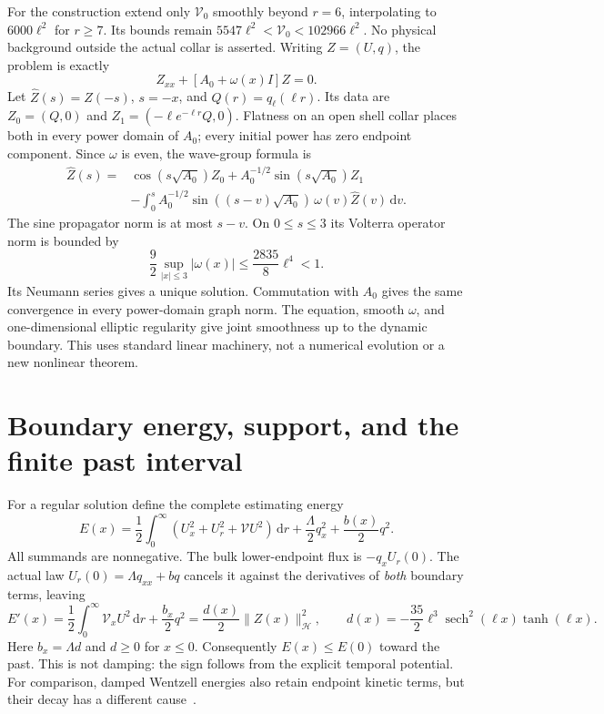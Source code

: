 \documentclass[11pt]{article}
\newcommand{\dd}{\,\mathrm d}
\newcommand{\norm}[1]{\lVert #1\rVert}
\newcommand{\HH}{\mathcal H}
\begin{document}
For the construction extend only $\mathcal V_0$ smoothly beyond $r=6$,
interpolating to $6000\ell^2$ for $r\ge7$. Its bounds remain
$5547\ell^2<\mathcal V_0<102966\ell^2$.
No physical background outside the actual collar is asserted.
Writing $Z=(U,q)$, the problem is exactly
\begin{equation}
 Z_{xx}+[A_0+\omega(x)I]Z=0.
 \label{eq:abstract}
\end{equation}
Let $\widehat Z(s)=Z(-s)$, $s=-x$, and $Q(r)=q_\ell(\ell r)$.
Its data are $Z_0=(Q,0)$ and
$Z_1=(-\ell e^{-\ell r}Q,0)$. Flatness on an open shell collar places
both in every power domain of $A_0$; every initial power has zero
endpoint component. Since $\omega$ is even, the wave-group formula is
\begin{equation}
\begin{aligned}
 \widehat Z(s)={}&\cos(s\sqrt{A_0})Z_0+
               A_0^{-1/2}\sin(s\sqrt{A_0})Z_1\\
 &-\int_0^s A_0^{-1/2}\sin((s-v)\sqrt{A_0})\,
                   \omega(v)\widehat Z(v)\dd v .
\end{aligned}
\label{eq:volterra}
\end{equation}
The sine propagator norm is at most $s-v$. On $0\le s\le3$ its
Volterra operator norm is bounded by
\begin{equation}
 \frac92\sup_{|x|\le3}|\omega(x)|
       \le\frac{2835}{8}\ell^4<1 .
 \label{eq:contraction}
\end{equation}
Its Neumann series gives a unique solution. Commutation with $A_0$
gives the same convergence in every power-domain graph norm.
The equation, smooth $\omega$, and one-dimensional elliptic regularity
give joint smoothness up to the dynamic boundary.
This uses standard linear machinery, not a numerical evolution or a
new nonlinear theorem.

\section{Boundary energy, support, and the finite past interval}
For a regular solution define the complete estimating energy
\begin{equation}
 E(x)=\frac12\int_0^\infty
       (U_x^2+U_r^2+\mathcal VU^2)\dd r
        +\frac{\Lambda}{2}q_x^2+\frac{b(x)}2q^2.
 \label{eq:energy}
\end{equation}
All summands are nonnegative. The bulk lower-endpoint flux is
$-q_xU_r(0)$. The actual law $U_r(0)=\Lambda q_{xx}+bq$ cancels it
against the derivatives of \emph{both} boundary terms, leaving
\begin{equation}
 E'(x)=\frac12\int_0^\infty\mathcal V_xU^2\dd r
          +\frac{b_x}2q^2
       =\frac{d(x)}2\norm{Z(x)}_{\HH}^2,\qquad
 d(x)=-\frac{35}{2}\ell^3\operatorname{sech}^2(\ell x)\tanh(\ell x).
 \label{eq:energyidentity}
\end{equation}
Here $b_x=\Lambda d$ and $d\ge0$ for $x\le0$.
Consequently $E(x)\le E(0)$ toward the past.
This is not damping: the sign follows from the explicit temporal potential.
For comparison, damped Wentzell energies also retain endpoint kinetic
terms, but their decay has a different cause~\cite{dahmani}.
\end{document}
